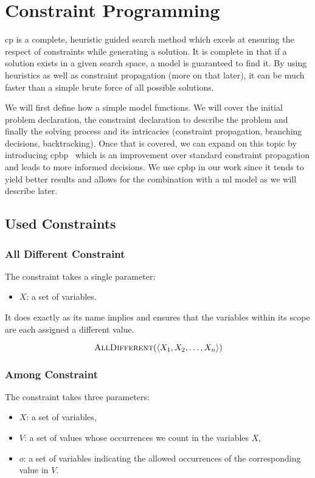 \documentclass[../Document.tex]{subfiles}
\begin{document}
\section{Constraint Programming}
\label{sec:intro/cp}
\acrlong{cp} is a complete, heuristic guided search method which excels at ensuring the respect of constraints while generating a solution. It is complete in that if a solution exists in a given search space, a \cp model is guaranteed to find it. By using heuristics as well as constraint propagation (more on that later), it can be much faster than a simple brute force of all possible solutions.

We will first define how a simple \cp model functions. We will cover the initial problem declaration, the constraint declaration to describe the problem and finally the solving process and its intricacies (constraint propagation, branching decisions, backtracking).
Once that is covered, we can expand on this topic by introducing \gls{cpbp}~\cite{GP:BP}
which is an improvement over standard constraint propagation and leads to more informed decisions. We use \gls{cpbp} in our work since it tends to yield better results and allows for the combination with a \gls{ml} model as we will describe later.

\subsection{Used Constraints}

\subsubsection{All Different Constraint}
The \alldifferent constraint takes a single parameter:
\begin{itemize}
    \item $X$: a set of variables.
\end{itemize}

It does exactly as its name implies and ensures that the variables within its scope are each assigned a different value.

$$
    \mbox{\sc AllDifferent}(\langle X_1, X_2, \ldots, X_n \rangle)
$$

\subsubsection{Among Constraint}
The \among constraint takes three parameters: 
\begin{itemize}
    \item $X$: a set of variables,
    \item $V$: a set of values whose occurrences we count in the variables $X$,
    \item $o$: a set of variables indicating the allowed occurrences of the corresponding value in $V$.
\end{itemize}
\end{document}
